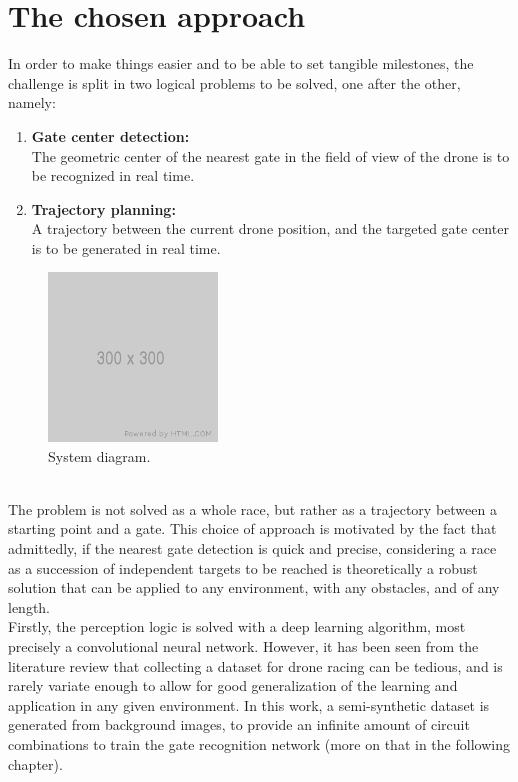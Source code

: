 \section{The chosen approach}

In order to make things easier and to be able to set tangible milestones, the
challenge is split in two logical problems to be solved, one after the
other, namely:
\begin{enumerate}
	\item{\textbf{Gate center detection:\\}
			The geometric center of the nearest gate in the field of view of the
			drone is to be recognized in real time.
	}
	\item{\textbf{Trajectory planning:\\}
			A trajectory between the current drone position, and the targeted gate
			center is to be generated in real time.
	}
\end{enumerate}

\begin{figure}[h!]
	\centering
	\includegraphics[width=0.4\textwidth]{figure/300x300.png}
	\caption{System diagram.}
	\label{fig:system}
\end{figure}

~\\The problem is not solved as a whole race, but rather as a trajectory
between a starting point and a gate. This choice of approach is motivated by
the fact that admittedly, if the nearest gate detection is quick and precise,
considering a race as a succession of independent targets to be reached is
theoretically a robust solution that can be applied to any environment, with any
obstacles, and of any length.\\

Firstly, the perception logic is solved with a deep learning algorithm, most
precisely a convolutional neural network. However, it has been seen from
the literature review that collecting a dataset for drone racing can be
tedious, and is rarely variate enough to allow for good generalization of the
learning and application in any given environment. In this work, a
semi-synthetic dataset is generated from background images, to provide an
infinite amount of circuit combinations to train the gate recognition network
(more on that in the following chapter).

